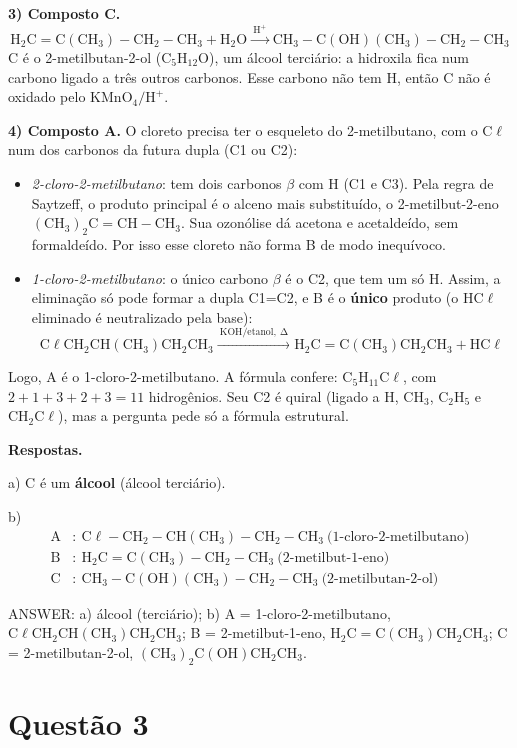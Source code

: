 \documentclass{article}%
\begin{document}
\textbf{3) Composto C.}
\[
\mathrm{H_2C=C(CH_3)-CH_2-CH_3 + H_2O \xrightarrow{\ H^+\ } CH_3-C(OH)(CH_3)-CH_2-CH_3}
\]
C é o 2-metilbutan-2-ol ($\mathrm{C_5H_{12}O}$), um álcool terciário: a hidroxila fica num carbono ligado a três outros carbonos. Esse carbono não tem H, então C não é oxidado pelo $\mathrm{KMnO_4/H^+}$.

\textbf{4) Composto A.} O cloreto precisa ter o esqueleto do 2-metilbutano, com o C$\ell$ num dos carbonos da futura dupla (C1 ou C2):
\begin{itemize}
\item \emph{2-cloro-2-metilbutano}: tem dois carbonos $\beta$ com H (C1 e C3). Pela regra de Saytzeff, o produto principal é o alceno mais substituído, o 2-metilbut-2-eno $\mathrm{(CH_3)_2C=CH-CH_3}$. Sua ozonólise dá acetona e acetaldeído, sem formaldeído. Por isso esse cloreto não forma B de modo inequívoco.
\item \emph{1-cloro-2-metilbutano}: o único carbono $\beta$ é o C2, que tem um só H. Assim, a eliminação só pode formar a dupla C1=C2, e B é o \textbf{único} produto (o HC$\ell$ eliminado é neutralizado pela base):
\[
\mathrm{C\ell CH_2CH(CH_3)CH_2CH_3 \xrightarrow{\ KOH/etanol,\ \Delta\ } H_2C=C(CH_3)CH_2CH_3 + HC\ell}
\]
\end{itemize}
Logo, A é o 1-cloro-2-metilbutano. A fórmula confere: $\mathrm{C_5H_{11}C\ell}$, com $2+1+3+2+3=11$ hidrogênios. Seu C2 é quiral (ligado a H, $\mathrm{CH_3}$, $\mathrm{C_2H_5}$ e $\mathrm{CH_2C\ell}$), mas a pergunta pede só a fórmula estrutural.

\textbf{Respostas.}

a) C é um \textbf{álcool} (álcool terciário).

b)
\[
\begin{aligned}
\text{A}&:\ \mathrm{C\ell-CH_2-CH(CH_3)-CH_2-CH_3}\ \text{(1-cloro-2-metilbutano)}\\
\text{B}&:\ \mathrm{H_2C=C(CH_3)-CH_2-CH_3}\ \text{(2-metilbut-1-eno)}\\
\text{C}&:\ \mathrm{CH_3-C(OH)(CH_3)-CH_2-CH_3}\ \text{(2-metilbutan-2-ol)}
\end{aligned}
\]

ANSWER: a) álcool (terciário); b) A = 1-cloro-2-metilbutano, $\mathrm{C\ell CH_2CH(CH_3)CH_2CH_3}$; B = 2-metilbut-1-eno, $\mathrm{H_2C=C(CH_3)CH_2CH_3}$; C = 2-metilbutan-2-ol, $\mathrm{(CH_3)_2C(OH)CH_2CH_3}$.%
\newpage%
\section*{Questão 3}
\end{document}
